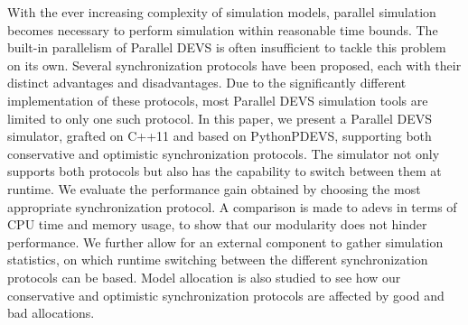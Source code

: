 With the ever increasing complexity of simulation models, parallel simulation becomes necessary to perform simulation within reasonable time bounds.
The built-in parallelism of Parallel DEVS is often insufficient to tackle this problem on its own.
Several synchronization protocols have been proposed, each with their distinct advantages and disadvantages.
Due to the significantly different implementation of these protocols, most Parallel DEVS simulation tools are limited to only one such protocol.
In this paper, we present a Parallel DEVS simulator, grafted on C++11 and based on PythonPDEVS, supporting both conservative and optimistic synchronization protocols.
The simulator not only supports both protocols but also has the capability to switch between them at runtime.
We evaluate the performance gain obtained by choosing the most appropriate synchronization protocol.
A comparison is made to adevs in terms of CPU time and memory usage, to show that our modularity does not hinder performance.
We further allow for an external component to gather simulation statistics, on which runtime switching between the different synchronization protocols can be based.
Model allocation is also studied to see how our conservative and optimistic synchronization protocols are affected by good and bad allocations.
